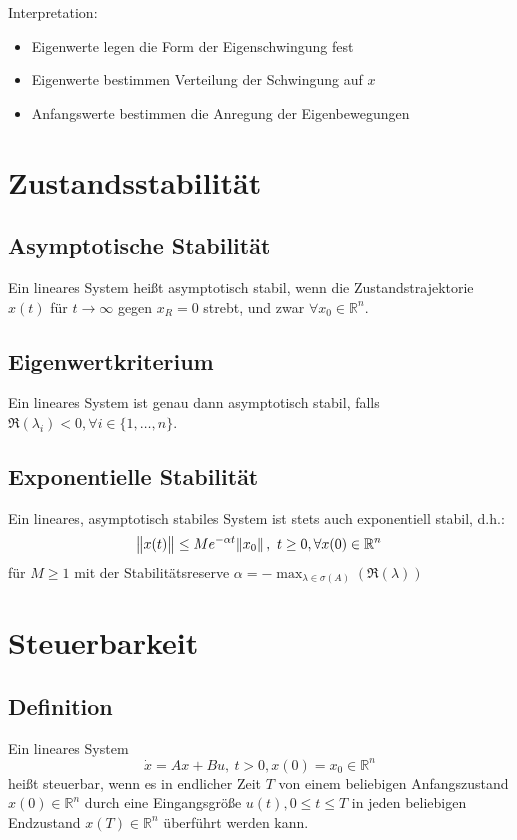 Interpretation:
\begin{itemize}
    \item Eigenwerte legen die Form der Eigenschwingung fest
    \item Eigenwerte bestimmen Verteilung der Schwingung auf $x$
    \item Anfangswerte bestimmen die Anregung der Eigenbewegungen
\end{itemize}

\section{Zustandsstabilität}
\subsection{Asymptotische Stabilität}
Ein lineares System heißt asymptotisch stabil, wenn die Zustandstrajektorie $x(t)$ für
$t \to \infty$ gegen $x_R=0$ strebt, und zwar $\forall x_0 \in \mathbb{R}^n$.

\subsection{Eigenwertkriterium}
Ein lineares System ist genau dann asymptotisch stabil, falls $\Re(\lambda_i)<0,
\forall i \in \{1, \ldots, n\}$.

\subsection{Exponentielle Stabilität}
Ein lineares, asymptotisch stabiles System ist stets auch exponentiell stabil,
d.h.:
\begin{equation}
    \norm{x(t)} \leq M e^{-\alpha t} \norm{x_0},\ t \geq 0, \forall x(0) \in \mathbb{R}^n
\end{equation}
für $M\geq 1$ mit der Stabilitätsreserve $\alpha=-\max_{\lambda \in \sigma(A)}(\Re(\lambda))
$

\section{Steuerbarkeit}
\subsection{Definition}
Ein lineares System
\begin{equation}
    \dot{x} = Ax+Bu,\ t>0, x(0)=x_0 \in \mathbb{R}^n
\end{equation}
heißt steuerbar, wenn es in endlicher Zeit $T$ von einem beliebigen Anfangszustand $x(0)
\in \mathbb{R}^n$ durch eine Eingangsgröße $u(t), 0 \leq t \leq T$ in jeden beliebigen
Endzustand $x(T) \in \mathbb{R}^n$ überführt werden kann.

